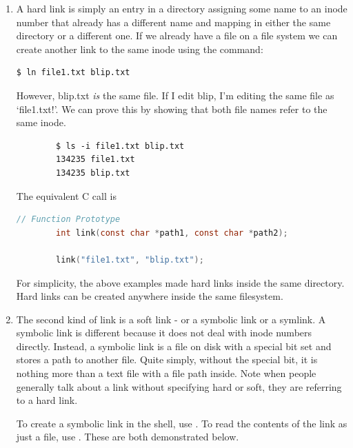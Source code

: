 \begin{enumerate}
    \item {}
        A hard link is simply an entry in a directory assigning some name to an inode number that already has a different name and mapping in either the same directory or a different one.
        If we already have a file on a file system we can create another link to the same inode using the  command:

        \begin{lstlisting}[language=bash]
            $ ln file1.txt blip.txt
        \end{lstlisting}

        However, blip.txt \emph{is} the same file.
        If I edit blip, I'm editing the same file as `file1.txt!'.
        We can prove this by showing that both file names refer to the same inode.

        \begin{verbatim}
        $ ls -i file1.txt blip.txt
        134235 file1.txt
        134235 blip.txt
        \end{verbatim}

        The equivalent C call is 

        \begin{lstlisting}[language=C]
        // Function Prototype
        int link(const char *path1, const char *path2);

        link("file1.txt", "blip.txt");
        \end{lstlisting}

        For simplicity, the above examples made hard links inside the same directory.
        Hard links can be created anywhere inside the same filesystem.

    \item {}
        The second kind of link is a soft link - or a symbolic link or a symlink.
        A symbolic link is different because it does not deal with inode numbers directly.
        Instead, a symbolic link is a file on disk with a special bit set and stores a path to another file.
        Quite simply, without the special bit, it is nothing more than a text file with a file path inside.
        Note when people generally talk about a link without specifying hard or soft, they are referring to a hard link.

        To create a symbolic link in the shell, use .
        To read the contents of the link as just a file, use .
        These are both demonstrated below.


\end{enumerate}
